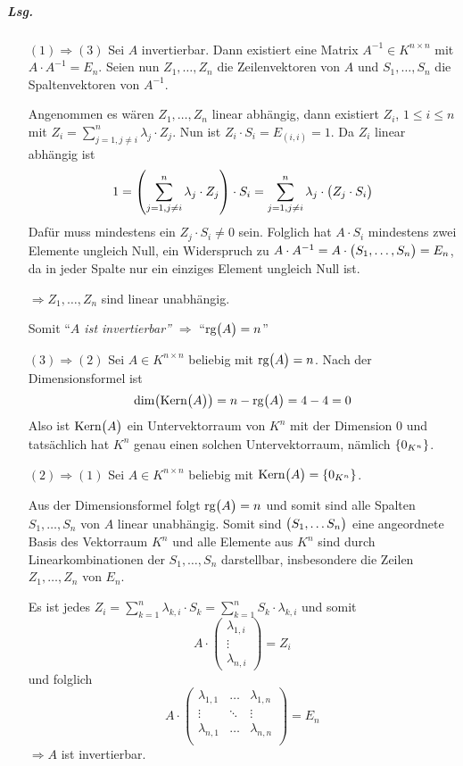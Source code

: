 \documentclass{scrreprt}
\begin{document}
\subparagraph{Lsg.}
\begin{itemize}
\item[$(1) \Rightarrow (3)$]  Sei $A$ invertierbar.
  Dann existiert eine Matrix $A^{-1} \in K^{n \times n}$ mit
  $A \cdot A^{-1} = E_n$.
  Seien nun $Z_1, \ldots, Z_n$ die Zeilenvektoren von $A$ und
  $S_1, \ldots, S_n$ die Spaltenvektoren von $A^{-1}$.

  Angenommen es wären $Z_1, \ldots, Z_n$ linear abhängig, dann existiert
  $Z_i$, $1 \leq i \leq n$ mit $Z_i = \sum_{j = 1, j \ne i}^n \lambda_j \cdot Z_j$.
  Nun ist $Z_i \cdot S_i = E_{(i,i)} = 1$.
  Da $Z_i$ linear abhängig ist
  \[
    1 = \qty(\sum_{j = 1, j \ne i}^n \lambda_j \cdot Z_j) \cdot S_i
    = \sum_{j = 1, j \ne i}^n \lambda_j \cdot \qty\big(Z_j \cdot S_i)
  \]
  Dafür muss mindestens ein $Z_j \cdot S_i \ne 0$ sein.
  Folglich hat $A \cdot S_i$ mindestens zwei Elemente ungleich Null, ein
  Widerspruch zu $A \cdot A^{-1} = A \cdot \qty\big(S_1, \ldots, S_n) = E_n$,
  da in jeder Spalte nur ein einziges Element ungleich Null ist.

  $\Rightarrow Z_1, \ldots, Z_n$ sind linear unabhängig.

  Somit ``\emph{$A$ ist invertierbar'' $\Rightarrow$} ``\emph{$\text{rg}\qty\big(A) = n$}''

\item[$(3) \Rightarrow (2)$] Sei $A \in K^{n \times n}$ beliebig mit
  $\text{rg}\qty\big(A) = n$.
  Nach der Dimensionsformel ist
  \[
    \text{dim}\qty(\text{Kern}\qty\big(A)) = n - \text{rg}\qty\big(A) = 4 - 4 = 0
  \]
  Also ist $\text{Kern}\qty\big(A)$ ein Untervektorraum von $K^n$ mit der
  Dimension $0$ und tatsächlich hat $K^n$ genau einen solchen Untervektorraum,
  nämlich $\qty{0_{K^n}}$.

\item[$(2) \Rightarrow (1)$] Sei $A \in K^{n \times n}$ beliebig mit
  $\text{Kern}\qty\big(A) = \qty{0_{K^n}}$.

  Aus der Dimensionsformel folgt $\text{rg}\qty\big(A) = n$ und somit sind
  alle Spalten $S_1, \ldots, S_n$ von $A$ linear unabhängig.
  Somit sind $\qty\big(S_1, \ldots S_n)$ eine angeordnete Basis des Vektorraum
  $K^n$ und alle Elemente aus $K^n$ sind durch Linearkombinationen der
  $S_1, \ldots, S_n$ darstellbar, insbesondere die Zeilen $Z_1, \ldots, Z_n$ von
  $E_n$.

  Es ist jedes $Z_i = \sum_{k = 1}^n \lambda_{k, i} \cdot S_k
  = \sum_{k = 1}^n S_k \cdot \lambda_{k, i}$ und somit
  \[
    A \cdot \begin{pmatrix}
      \lambda_{1, i} \\
      \vdots \\
      \lambda_{n, i}
    \end{pmatrix} = Z_i
  \]
  und folglich
  \[
    A \cdot \begin{pmatrix}
      \lambda_{1, 1} & \ldots & \lambda_{1, n}\\
      \vdots & \ddots & \vdots \\
      \lambda_{n, 1} & \ldots & \lambda_{n, n} \\
    \end{pmatrix} = E_n
  \]
  $\Rightarrow A$ ist invertierbar.
\end{itemize}
\end{document}
